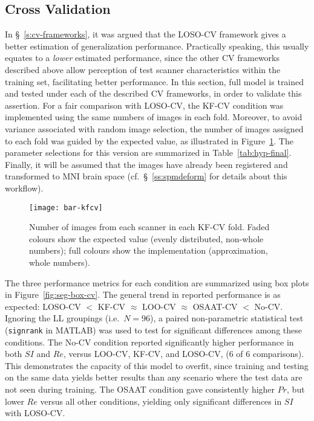 \subsection{Cross Validation}\label{ss:exp-cv}
In \S~\ref{s:cv-frameworks}, it was argued that the LOSO-CV framework
gives a better estimation of generalization performance.
Practically speaking, this usually equates to a \textit{lower} estimated performance,
since the other CV frameworks described above allow perception of test scanner characteristics
within the training set, facilitating better performance.
In this section, full model is trained and tested under each of the described CV frameworks,
in order to validate this assertion.
For a fair comparison with LOSO-CV, the KF-CV condition was implemented
using the same numbers of images in each fold.
Moreover, to avoid variance associated with random image selection,
the number of images assigned to each fold was guided by the expected value,
as illustrated in Figure~\ref{fig:bar-kfcv}.
The parameter selections for this version are summarized in Table~\ref{tab:hyp-final}.
Finally, it will be assumed that
the images have already been registered and transformed to MNI brain space
(cf.~\S~\ref{ss:spmdeform} for details about this workflow).
\par
\begin{figure}
  \centering
  \texttt{[image: bar-kfcv]}
  \caption{Number of images from each scanner in each KF-CV fold.
    Faded colours show the expected value (evenly distributed, non-whole numbers);
    full colours show the implementation (approximation, whole numbers).}%
  \label{fig:bar-kfcv}
\end{figure}
The three performance metrics for each condition are
summarized using box plots in Figure~\ref{fig:seg-box-cv}.
The general trend in reported performance is as expected:
LOSO-CV $<$ KF-CV $\approx$ LOO-CV $\approx$ OSAAT-CV $<$ No-CV.
Ignoring the LL groupings (i.e.\ $N = 96$),
a paired non-parametric statistical test (\texttt{signrank} in MATLAB)
was used to test for significant differences among these conditions.
The No-CV condition reported significantly higher performance in both $SI$ and $Re$,
versus LOO-CV, KF-CV, and LOSO-CV, (6 of 6 comparisons).
This demonstrates the capacity of this model to overfit,
since training and testing on the same data yields better results
than any scenario where the test data are not seen during training.
The OSAAT condition gave consistently higher $Pr$, but lower $Re$ %
versus all other conditions, yielding only significant differences in $SI$ with LOSO-CV.
